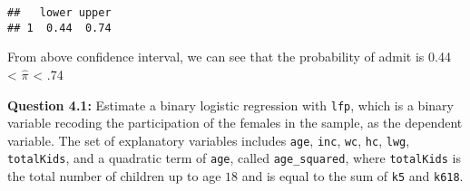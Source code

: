 \documentclass[]{article}
\newenvironment{Shaded}{\begin{snugshade}}{\end{snugshade}}
\newcommand{\CommentTok}[1]{\textcolor[rgb]{0.56,0.35,0.01}{\textit{#1}}}
\newcommand{\DataTypeTok}[1]{\textcolor[rgb]{0.13,0.29,0.53}{#1}}
\newcommand{\DecValTok}[1]{\textcolor[rgb]{0.00,0.00,0.81}{#1}}
\newcommand{\FloatTok}[1]{\textcolor[rgb]{0.00,0.00,0.81}{#1}}
\newcommand{\KeywordTok}[1]{\textcolor[rgb]{0.13,0.29,0.53}{\textbf{#1}}}
\newcommand{\NormalTok}[1]{#1}
\newcommand{\OperatorTok}[1]{\textcolor[rgb]{0.81,0.36,0.00}{\textbf{#1}}}
\newcommand{\StringTok}[1]{\textcolor[rgb]{0.31,0.60,0.02}{#1}}
\begin{document}
\begin{Shaded}
\end{Shaded}

\begin{verbatim}
##   lower upper
## 1  0.44  0.74
\end{verbatim}

From above confidence interval, we can see that the probability of admit
is 0.44 \textless{} \(\hat\pi\) \textless{} .74

\newpage

\textbf{Question 4.1:} Estimate a binary logistic regression with
\texttt{lfp}, which is a binary variable recoding the participation of
the females in the sample, as the dependent variable. The set of
explanatory variables includes \texttt{age}, \texttt{inc}, \texttt{wc},
\texttt{hc}, \texttt{lwg}, \texttt{totalKids}, and a quadratic term of
\texttt{age}, called \texttt{age\_squared}, where \texttt{totalKids} is
the total number of children up to age \(18\) and is equal to the sum of
\texttt{k5} and \texttt{k618}.

\begin{Shaded}
\end{Shaded}
\end{document}
